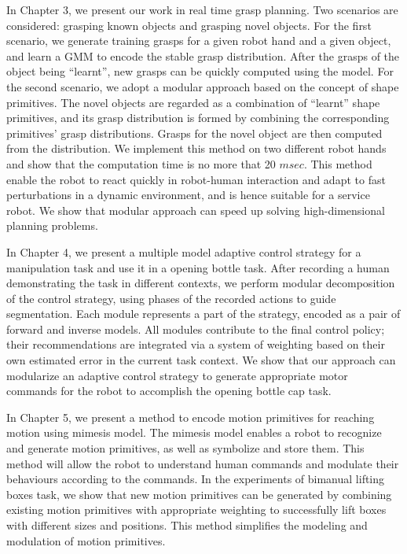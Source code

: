 In Chapter 3, we present our work in real time grasp planning. Two scenarios are considered: grasping known objects and grasping novel objects. For the first scenario, we generate training grasps for a given robot hand and a given object, and learn a GMM to encode the stable grasp distribution. After the grasps of the object being ``learnt'', new grasps can be quickly computed using the model. For the second scenario, we adopt a modular approach based on the concept of shape primitives. The novel objects are regarded as a combination of ``learnt'' shape primitives, and its grasp distribution is formed by combining the corresponding primitives' grasp distributions. Grasps for the novel object are then computed from the distribution. We implement this method on two different robot hands and show that the computation time is no more that 20 $msec$. This method enable the robot to react quickly in robot-human interaction and adapt to fast perturbations in a dynamic environment, and is hence suitable for a service robot. We show that modular approach can speed up solving high-dimensional planning problems.

In Chapter 4, we present a multiple model adaptive control strategy for a manipulation task and use it in a opening bottle task. After recording a human demonstrating the task in different contexts, we perform modular decomposition of the control strategy, using phases of the recorded actions to guide segmentation. Each module represents a part of the strategy, encoded as a pair of forward and inverse models. All modules contribute to the final control policy; their recommendations are integrated via a system of weighting based on their own estimated error in the current task context. We show that our approach can
modularize an adaptive control strategy to generate appropriate motor commands for the robot to accomplish the opening bottle cap task.

In Chapter 5, we present a method to encode motion primitives for reaching motion using mimesis model. The mimesis model enables a robot to recognize and generate motion primitives, as well as symbolize and store them. This method will allow the robot to understand human commands and modulate their behaviours according to the commands. In the experiments of bimanual lifting boxes task, we show that new motion primitives can be generated by combining existing motion primitives with appropriate weighting to successfully lift boxes with different sizes and positions. This method simplifies the modeling and modulation of motion primitives.

